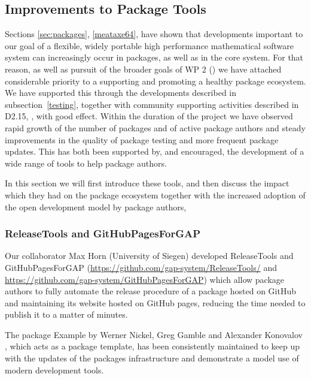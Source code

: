 \subsection{Improvements to \GAP Package Tools}\label{sec:package-tools}

Sections \ref{sec:packages}, \ref{meataxe64},  have shown
that developments important to our goal of a flexible, widely portable high performance
mathematical software system can increasingly occur in packages, as
well as in the core \GAP system. For that reason, as well as pursuit
of the broader goals of WP 2 () we have attached
considerable priority to a supporting and promoting a healthy \GAP
package ecosystem. We have supported this through the developments described in subsection~\ref{testing}, together with community
supporting activities described in D2.15, , with
good effect. Within the duration of the \ODK
project we have observed rapid growth of the number of \GAP packages
and of active package
authors and steady improvements in the quality of package testing and more frequent
package updates. This has both been supported by, and encouraged, the
development of a wide range of tools to help package authors.

In this section we will first introduce these tools, and then discuss the
impact which they had on the package ecosystem together with the increased
adoption of the open development model by package authors,

\subsubsection{ReleaseTools and GitHubPagesForGAP}
Our collaborator Max Horn (University of Siegen) developed {\sf ReleaseTools}
and {\sf GitHubPagesForGAP} (\url{https://github.com/gap-system/ReleaseTools/}
and \url{https://github.com/gap-system/GitHubPagesForGAP}) which allow package
authors to fully automate the release procedure of a \GAP package hosted on GitHub
and maintaining its website hosted on GitHub pages,
reducing the time needed to publish it to a matter of minutes.

The \GAP package {\sf Example} by Werner Nickel, Greg Gamble and
Alexander Konovalov \cite{example}, which acts as a package template,
has been consistently maintained to keep up with the updates
of the packages infrastructure and demonstrate a model use of modern
development tools.

